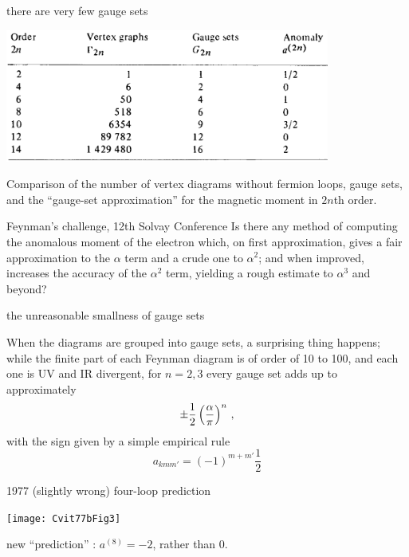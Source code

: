 \begin{frame}{there are very few gauge sets}
\begin{center}
\includegraphics[width=0.80\textwidth]{../../figs/Cvit77bTab1}
\end{center}
{\scriptsize  %
Comparison of the number of vertex diagrams without fermion loops, gauge
sets, and the ``gauge-set approximation'' for the magnetic
moment in $2n$th order.
}
\end{frame}

\begin{frame}{Feynman's challenge, 12th Solvay Conference}
Is there any method of computing the anomalous moment of the
electron which, on first approximation, gives a fair approximation to the
$\alpha$ term and a crude one to $\alpha^2$; and when improved, increases
the accuracy of the $\alpha^2$ term, yielding a rough estimate to
$\alpha^3$ and beyond?
\end{frame}

\begin{frame}{the unreasonable smallness of gauge sets}

When the diagrams are grouped into
gauge sets,
a surprising thing happens; while the
finite part of each Feynman diagram is of order of 10 to 100,
and each one is UV and IR divergent, for $n=2,3$
every gauge set adds up to approximately
\[
		   \pm {1 \over 2} \left(\frac{\alpha}{\pi}\right)^n
\,,
\]
with the sign given by a simple empirical rule
\[
a_{kmm'} = (-1)^{m+m'}\frac{1}{2}
\] %
\end{frame}


\begin{frame}{1977 (slightly wrong) four-loop prediction}
\begin{center}
\texttt{[image: Cvit77bFig3]}
\end{center}

{\scriptsize  %
new ``prediction'' : $a^{(8)}=-2$, rather than 0.
}
\end{frame}

